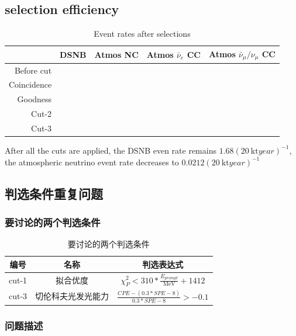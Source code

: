 \documentclass[12pt]{article}
\begin{document}
\subsection{selection efficiency}

\begin{table}[!htb]
    \caption{Event rates after selections}
    \begin{tabular}{rrrrr}
        \hline
         & DSNB & Atmos NC & Atmos $\bar{\nu}_e$ CC & Atmos $\bar{\nu}_{\mu} / \nu_{\mu}$ CC \\
        \hline
        Before cut & & & & \\
        Coincidence & & & & \\
        Goodness & & & & \\
        Cut-2 & & & & \\
        Cut-3 & & & & \\
        \hline
    \end{tabular}
\end{table}

After all the cuts are applied, the DSNB even rate remains $1.68 (\SI{20}{\kilo\tonne year})^{-1}$, the atmospheric neutrino event rate decreases to $0.0212 (\SI{20}{\kilo\tonne year})^{-1}$

\subsection{判选条件重复问题}
\subsubsection{要讨论的两个判选条件}

\begin{table}[!htb]
    \centering
    \caption{要讨论的两个判选条件}
    \begin{tabular}{ccc}
        \hline
        编号 & 名称 & 判选表达式 \\
        \hline
        cut-1 & 拟合优度 & $\chi_P^2 < 310 * \frac{E_{prompt}}{\si{\MeV}} + 1412$ \\
        cut-3 & 切伦科夫光发光能力 & $\frac{CPE - (0.3 * SPE - 8)}{0.3 * SPE - 8} > -0.1$ \\
        \hline
    \end{tabular}
\end{table}

\subsubsection{问题描述}
\end{document}
